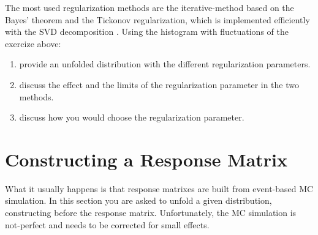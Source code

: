 \documentclass[a4paper,11pt]{article}
\begin{document}
The most used regularization methods are the iterative-method based on the Bayes' theorem \cite{dAgostini} and the Tickonov regularization, which is implemented efficiently with the \gls{SVD} decomposition \cite{SVD}.
Using the histogram with fluctuations of the exercize above:
\begin{enumerate}
	\item provide an unfolded distribution with the different regularization parameters.
	\item discuss the effect and the limits of the regularization parameter in the two methods.
	\item discuss how you would choose the regularization parameter.
\end{enumerate}

\section{Constructing a Response Matrix}

What it usually happens is that response matrixes are built from event-based \gls{MC} simulation.
In this section you are asked to unfold a given distribution, constructing before the response matrix.
Unfortunately, the \gls{MC} simulation is not-perfect and needs to be corrected for small effects.

\FloatBarrier
\nocite{*}
%


\cleardoublepage
\end{document}
